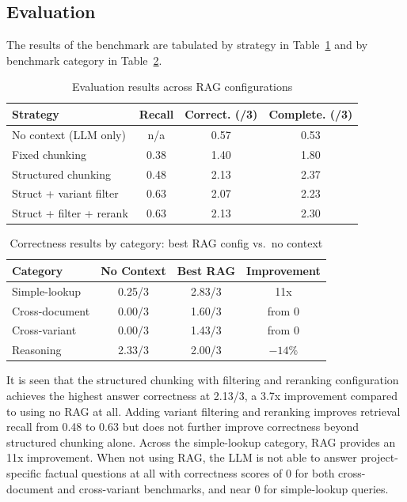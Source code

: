 \documentclass[conference]{IEEEtran}
\begin{document}
\subsection{Evaluation}

The results of the benchmark are tabulated by strategy in Table~\ref{tab:benchmark_results_strat} and by benchmark category in Table~\ref{tab:benchmark_results_categ}. 

\begin{table}[h]
\centering
\caption{Evaluation results across RAG configurations}
\begin{tabular}{lccc}
\hline
\textbf{Strategy} & \textbf{Recall} & \textbf{Correct. (/3)} & \textbf{Complete. (/3)} \\
\hline
No context (LLM only)       & n/a  & 0.57 & 0.53 \\
Fixed chunking              & 0.38 & 1.40 & 1.80 \\
Structured chunking         & 0.48 & 2.13 & 2.37 \\
Struct + variant filter     & 0.63 & 2.07 & 2.23 \\
Struct + filter + rerank    & 0.63 & 2.13 & 2.30 \\
\hline
\end{tabular}
\label{tab:benchmark_results_strat}
\end{table}

\begin{table}[h]
\centering
\caption{Correctness results by category: best RAG config vs.\ no context}
\begin{tabular}{lccc}
\hline
\textbf{Category} & \textbf{No Context} & \textbf{Best RAG} & \textbf{Improvement} \\
\hline
Simple-lookup    & 0.25/3 & 2.83/3 & 11x \\
Cross-document   & 0.00/3 & 1.60/3 & from 0 \\
Cross-variant    & 0.00/3 & 1.43/3 & from 0 \\
Reasoning        & 2.33/3 & 2.00/3 & $-14\%$ \\
\hline
\end{tabular}
\label{tab:benchmark_results_categ}
\end{table}

It is seen that the structured chunking with filtering and reranking configuration achieves the highest answer correctness at 2.13/3, a 3.7x improvement compared to using no RAG at all. Adding variant filtering and reranking improves retrieval recall from 0.48 to 0.63 but does not further improve correctness beyond structured chunking alone. Across the simple-lookup category, RAG provides an 11x improvement. When not using RAG, the LLM is not able to answer project-specific factual questions at all with correctness scores of 0 for both cross-document and cross-variant benchmarks, and near 0 for simple-lookup queries.
\end{document}
